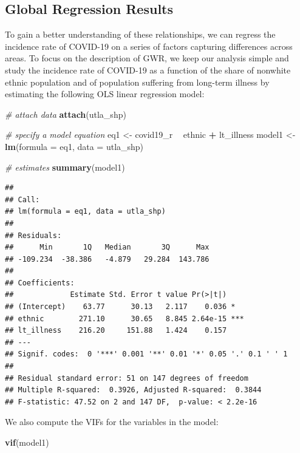 \documentclass[
]{book}
\newenvironment{Shaded}{\begin{snugshade}}{\end{snugshade}}
\newcommand{\CommentTok}[1]{\textcolor[rgb]{0.56,0.35,0.01}{\textit{#1}}}
\newcommand{\DataTypeTok}[1]{\textcolor[rgb]{0.13,0.29,0.53}{#1}}
\newcommand{\KeywordTok}[1]{\textcolor[rgb]{0.13,0.29,0.53}{\textbf{#1}}}
\newcommand{\NormalTok}[1]{#1}
\newcommand{\OperatorTok}[1]{\textcolor[rgb]{0.81,0.36,0.00}{\textbf{#1}}}
\newcommand{\StringTok}[1]{\textcolor[rgb]{0.31,0.60,0.02}{#1}}
\begin{document}
\hypertarget{global-regression-results}{%
\subsection{Global Regression Results}\label{global-regression-results}}

To gain a better understanding of these relationships, we can regress the incidence rate of COVID-19 on a series of factors capturing differences across areas. To focus on the description of GWR, we keep our analysis simple and study the incidence rate of COVID-19 as a function of the share of nonwhite ethnic population and of population suffering from long-term illness by estimating the following OLS linear regression model:

\begin{Shaded}
\begin{Highlighting}[]
\CommentTok{# attach data}
\KeywordTok{attach}\NormalTok{(utla_shp)}

\CommentTok{# specify a model equation}
\NormalTok{eq1 <-}\StringTok{ }\NormalTok{covid19_r }\OperatorTok{~}\StringTok{ }\NormalTok{ethnic }\OperatorTok{+}\StringTok{ }\NormalTok{lt_illness}
\NormalTok{model1 <-}\StringTok{ }\KeywordTok{lm}\NormalTok{(}\DataTypeTok{formula =}\NormalTok{ eq1, }\DataTypeTok{data =}\NormalTok{ utla_shp)}

\CommentTok{# estimates}
\KeywordTok{summary}\NormalTok{(model1)}
\end{Highlighting}
\end{Shaded}

\begin{verbatim}
## 
## Call:
## lm(formula = eq1, data = utla_shp)
## 
## Residuals:
##      Min       1Q   Median       3Q      Max 
## -109.234  -38.386   -4.879   29.284  143.786 
## 
## Coefficients:
##             Estimate Std. Error t value Pr(>|t|)    
## (Intercept)    63.77      30.13   2.117    0.036 *  
## ethnic        271.10      30.65   8.845 2.64e-15 ***
## lt_illness    216.20     151.88   1.424    0.157    
## ---
## Signif. codes:  0 '***' 0.001 '**' 0.01 '*' 0.05 '.' 0.1 ' ' 1
## 
## Residual standard error: 51 on 147 degrees of freedom
## Multiple R-squared:  0.3926, Adjusted R-squared:  0.3844 
## F-statistic: 47.52 on 2 and 147 DF,  p-value: < 2.2e-16
\end{verbatim}

We also compute the VIFs for the variables in the model:

\begin{Shaded}
\begin{Highlighting}[]
\KeywordTok{vif}\NormalTok{(model1)}
\end{Highlighting}
\end{Shaded}
\end{document}
